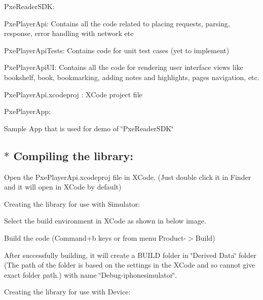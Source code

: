 \begin{DoxyItemize}
\item Pxe\-Reader\-S\-D\-K\-:
\begin{DoxyEnumerate}
\item Pxe\-Player\-Api\-: Contains all the code related to placing requests, parsing, response, error handling with network etc
\item Pxe\-Player\-Api\-Tests\-: Contains code for unit test cases (yet to implement)
\item Pxe\-Player\-Api\-U\-I\-: Contains all the code for rendering user interface views like bookshelf, book, bookmarking, adding notes and highlights, pages navigation, etc.
\item Pxe\-Player\-Api.\-xcodeproj \-: X\-Code project file
\end{DoxyEnumerate}
\item Pxe\-Player\-App\-:
\end{DoxyItemize}
\begin{DoxyEnumerate}
\item Sample App that is used for demo of \char`\"{}\-Pxe\-Reader\-S\-D\-K\char`\"{}
\end{DoxyEnumerate}\hypertarget{index_step4}{}\subsection{$\ast$ Compiling the library\-:}\label{index_step4}
Open the Pxe\-Player\-Api.\-xcodeproj file in X\-Code. (Just double click it in Finder and it will open in X\-Code by default)
\begin{DoxyItemize}
\item Creating the library for use with Simulator\-:
\end{DoxyItemize}
\begin{DoxyEnumerate}
\item Select the build environment in X\-Code as shown in below image.
\item Build the code (Command+b keys or from menu Product-\/$>$Build)
\item After successfully building, it will create a B\-U\-I\-L\-D folder in \char`\"{}\-Derived Data\char`\"{} folder (The path of the folder is based on the settings in the X\-Code and so cannot give exact folder path.) with name \char`\"{}\-Debug-\/iphonesimulator\char`\"{}.
\end{DoxyEnumerate}
\begin{DoxyItemize}
\item Creating the library for use with Device\-:
\end{DoxyItemize}
